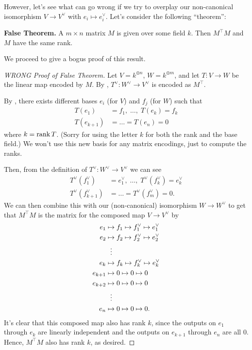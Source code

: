 However, let's see what can go wrong if we try to overplay our non-canonical isomorphism
$V \to V^\vee$ with $e_i \mapsto e_i^\vee$.
Let's consider the following ``theorem'':
\begin{tcolorbox}
	\textbf{False Theorem.}
	A $m \times n$ matrix $M$ is given over some field $k$.
	Then $M^\top M$ and $M$ have the same rank.
\end{tcolorbox}

We proceed to give a bogus proof of this result.
\begin{proof}[WRONG Proof of False Theorem]
	Let $V = k^{\oplus n}$, $W = k^{\oplus m}$,
	and let $T \colon V \to W$ be the linear map encoded by $M$.
	By , $T^\vee \colon W^\vee \to V^\vee$
	is encoded as $M^\top$.

	By ,
	there exists different bases $e_i$ (for $V$) and $f_j$ (for $W$) such that
	\begin{align*}
		T(e_1) &= f_1, \; \dots, \; T(e_k) = f_k \\
		T(e_{k+1}) &= \dots = T(e_n) = 0
	\end{align*}
	where $k = \operatorname{rank} T$.
	(Sorry for using the letter $k$ for both the rank and the base field.)
	We won't use this new basis for any matrix encodings,
	just to compute the ranks.

	Then, from the definition of $T^\vee \colon W^\vee \to V^\vee$ we can see
	\begin{align*}
		T^\vee(f_1^\vee) &= e_1^\vee, \; \dots, \; T^\vee(f_k^\vee) = e_k^\vee \\
		T^\vee(f_{k+1}^\vee) &= \dots = T^\vee(f_m^\vee) = 0.
	\end{align*}
	We can then combine this with our (non-canonical) isomorphism $W \to W^\vee$
	to get that $M^\top M$ is the matrix for the composed map $V \to V^\vee$ by
	\begin{align*}
		e_1 & \mapsto f_1 \mapsto f_1^\vee \mapsto e_1^\vee \\
		e_2 & \mapsto f_2 \mapsto f_2^\vee \mapsto e_2^\vee \\
		&\vdotswithin\mapsto \\
		e_k & \mapsto f_k \mapsto f_k^\vee \mapsto e_k^\vee \\
		e_{k+1} &\mapsto 0 \mapsto 0 \mapsto 0 \\
		e_{k+2} &\mapsto 0 \mapsto 0 \mapsto 0 \\
		&\vdotswithin\mapsto \\
		e_n &\mapsto 0 \mapsto 0 \mapsto 0.
	\end{align*}
	It's clear that this composed map also has rank $k$,
	since the outputs on $e_1$ through $e_k$ are linearly independent
	and the outputs on $e_{k+1}$ through $e_n$ are all $0$.
	Hence, $M^\top M$ also has rank $k$, as desired.
\end{proof}

